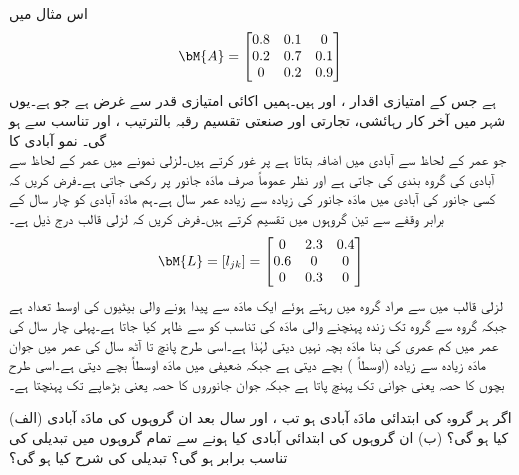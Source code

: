 اس مثال میں 
\begin{align*}
\bM{A}=\begin{bmatrix}
0.8&0.1&0\\0.2&0.7&0.1\\0&0.2&0.9
\end{bmatrix}
\end{align*}
ہے جس کے امتیازی اقدار ،  اور  ہیں۔ہمیں اکائی امتیازی قدر  سے غرض ہے جو  ہے۔یوں شہر میں آخر کار رہائشی، تجارتی اور صنعتی تقسیم رقبہ بالترتیب ،  اور  تناسب سے ہو گی۔
\quad نمو آبادی کا \\ 
 جو عمر کے لحاظ سے آبادی میں اضافہ بتاتا ہے پر غور کرتے ہیں۔لزلی نمونے میں عمر کے لحاظ سے آبادی کی گروہ بندی کی جاتی ہے اور نظر عموماً صرف مادَہ جانور پر رکھی جاتی ہے۔فرض کریں کہ کسی جانور کی آبادی میں مادَہ جانور کی زیادہ سے زیادہ عمر  سال ہے۔ہم مادَہ آبادی کو چار سال کے برابر وقفے سے تین گروہوں میں تقسیم کرتے ہیں۔فرض کریں کہ لزلی قالب درج ذیل ہے۔
\begin{align*}
\bM{L}=[l_{jk}]=\begin{bmatrix} 0& 2.3&0.4\\0.6&0&0\\0&0.3&0 \end{bmatrix}
\end{align*}
لزلی قالب میں   سے مراد  گروہ میں رہتے ہوئے  ایک مادَہ سے پیدا ہونے والی بیٹیوں کی اوسط تعداد ہے جبکہ گروہ  سے گروہ  تک زندہ پہنچنے والی مادَہ کی تناسب کو  سے ظاہر کیا جاتا ہے۔پہلی چار سال کی عمر میں کم عمری کی بنا مادَہ بچہ نہیں دیتی لہٰذا  ہے۔اسی طرح پانچ تا آٹھ سال کی عمر میں جوان مادَہ زیادہ سے زیادہ (اوسطاً ) بچے  دیتی ہے جبکہ ضعیفی  میں مادَہ  اوسطاً  بچے دیتی ہے۔اسی طرح بچوں کا  حصہ یعنی   جوانی تک پہنچ پاتا ہے جبکہ جوان جانوروں کا  حصہ یعنی  بڑھاپے تک پہنچتا ہے۔ 

 (الف) اگر ہر گروہ  کی ابتدائی مادَہ  آبادی  ہو تب ،  اور  سال بعد ان گروہوں کی مادَہ آبادی کیا ہو گی؟ (ب)  ان گروہوں کی ابتدائی آبادی کیا ہونے سے تمام گروہوں میں تبدیلی کی تناسب برابر ہو گی؟ تبدیلی کی شرح  کیا ہو گی؟


